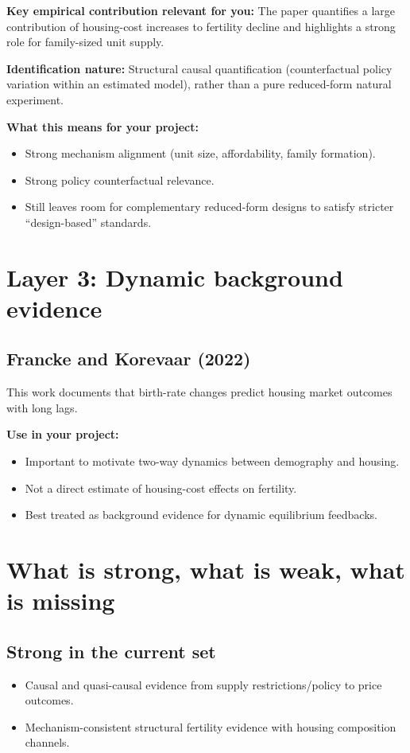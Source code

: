 \documentclass[11pt]{article}
\begin{document}
\textbf{Key empirical contribution relevant for you:}
The paper quantifies a large contribution of housing-cost increases to fertility decline and highlights a strong role for family-sized unit supply.

\textbf{Identification nature:}
Structural causal quantification (counterfactual policy variation within an estimated model), rather than a pure reduced-form natural experiment.

\textbf{What this means for your project:}
\begin{itemize}
\item Strong mechanism alignment (unit size, affordability, family formation).
\item Strong policy counterfactual relevance.
\item Still leaves room for complementary reduced-form designs to satisfy stricter ``design-based'' standards.
\end{itemize}

\section{Layer 3: Dynamic background evidence}
\subsection*{Francke and Korevaar (2022)}
This work documents that birth-rate changes predict housing market outcomes with long lags.

\textbf{Use in your project:}
\begin{itemize}
\item Important to motivate two-way dynamics between demography and housing.
\item Not a direct estimate of housing-cost effects on fertility.
\item Best treated as background evidence for dynamic equilibrium feedbacks.
\end{itemize}

\section{What is strong, what is weak, what is missing}
\subsection*{Strong in the current set}
\begin{itemize}
\item Causal and quasi-causal evidence from supply restrictions/policy to price outcomes.
\item Mechanism-consistent structural fertility evidence with housing composition channels.
\end{itemize}
\end{document}
